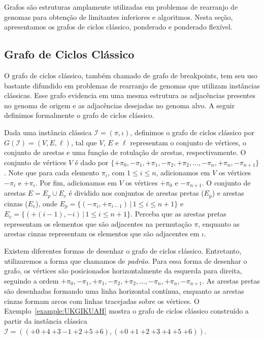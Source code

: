 Grafos são estruturas amplamente utilizadas em problemas de rearranjo de genomas para obtenção de limitantes inferiores e algoritmos. Nesta seção, apresentamos os grafos de ciclos clássico, ponderado e ponderado flexível.

\subsection{Grafo de Ciclos Clássico}

O grafo de ciclos clássico, também chamado de grafo de breakpoints, tem seu uso bastante difundido em problemas de rearranjo de genomas que utilizam instâncias clássicas. Esse grafo evidencia em uma mesma estrutura as adjacências presentes no genoma de origem e as adjacências desejadas no genoma alvo. A seguir definimos formalmente o grafo de ciclos clássico.

Dada uma instância clássica $\mathcal{I} = (\pi,\iota)$, definimos o grafo de ciclos clássico por $G(\mathcal{I}) = (V, E, \ell)$, tal que $V$, $E$ e $\ell$ representam o conjunto de vértices, o conjunto de arestas e uma função de rotulação de arestas, respectivamente. O conjunto de vértices $V$ é dado por $\{{+\pi_0}, {-\pi_1}, {+\pi_1}, {-\pi_2}, {+\pi_2}, \dots, {-\pi_n}, {+\pi_n}, {-\pi_{n+1}}\}$. Note que para cada elemento $\pi_i$, com $1 \le i \le n$, adicionamos em $V$ os vértices ${-\pi_i}$ e ${+\pi_i}$. Por fim, adicionamos em $V$ os vértices ${+\pi_0}$ e ${-\pi_{n+1}}$. O conjunto de arestas $E = E_p \cup E_c$ é dividido nos conjuntos de arestas pretas ($E_p$) e arestas cinzas ($E_c$), onde $E_p = \{(-\pi_i, +\pi_{i-1}) \,|\, 1 \leq i \leq n+1\}$ e $E_c = \{(+(i-1), -i) \,|\, 1 \leq i \leq n + 1\}$. Perceba que as arestas pretas representam os elementos que são adjacentes na permutação $\pi$, enquanto as arestas cinzas representam os elementos que são adjacentes em $\iota$.

Existem diferentes formas de desenhar o grafo de ciclos clássico. Entretanto, utilizaremos a forma que chamamos de \emph{padrão}. Para essa forma de desenhar o grafo, os vértices são posicionados horizontalmente da esquerda para direita, seguindo a ordem ${+\pi_0}, {-\pi_1}, {+\pi_1}, {-\pi_2}, {+\pi_2}, \dots, {-\pi_n}, {+\pi_n}, {-\pi_{n+1}}$. As arestas pretas são desenhadas formando uma linha horizontal contínua, enquanto as arestas cinzas formam arcos com linhas tracejadas sobre os vértices. O Exemplo~\ref{example:UKGIKUAH} mostra o grafo de ciclos clássico construído a partir da instância clássica $\mathcal{I} = (({+0}~{+4}~{+3}~{-1}~{+2}~{+5}~{+6}),({+0}~{+1}~{+2}~{+3}~{+4}~{+5}~{+6}))$.

